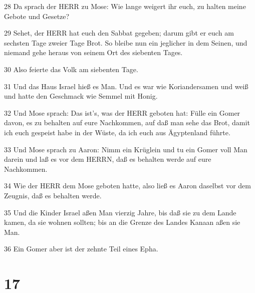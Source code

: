 \par 28 Da sprach der HERR zu Mose: Wie lange weigert ihr euch, zu halten meine Gebote und Gesetze?
\par 29 Sehet, der HERR hat euch den Sabbat gegeben; darum gibt er euch am sechsten Tage zweier Tage Brot. So bleibe nun ein jeglicher in dem Seinen, und niemand gehe heraus von seinem Ort des siebenten Tages.
\par 30 Also feierte das Volk am siebenten Tage.
\par 31 Und das Haus Israel hieß es Man. Und es war wie Koriandersamen und weiß und hatte den Geschmack wie Semmel mit Honig.
\par 32 Und Mose sprach: Das ist's, was der HERR geboten hat: Fülle ein Gomer davon, es zu behalten auf eure Nachkommen, auf daß man sehe das Brot, damit ich euch gespeist habe in der Wüste, da ich euch aus Ägyptenland führte.
\par 33 Und Mose sprach zu Aaron: Nimm ein Krüglein und tu ein Gomer voll Man darein und laß es vor dem HERRN, daß es behalten werde auf eure Nachkommen.
\par 34 Wie der HERR dem Mose geboten hatte, also ließ es Aaron daselbst vor dem Zeugnis, daß es behalten werde.
\par 35 Und die Kinder Israel aßen Man vierzig Jahre, bis daß sie zu dem Lande kamen, da sie wohnen sollten; bis an die Grenze des Landes Kanaan aßen sie Man.
\par 36 Ein Gomer aber ist der zehnte Teil eines Epha.

\chapter{17}

